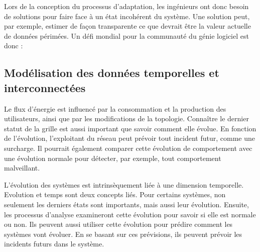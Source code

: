 Lors de la conception du processus d'adaptation, les ingénieurs ont donc besoin de solutions pour faire face à un état incohérent du système. Une solution peut, par exemple, estimer de façon transparente ce que devrait être la valeur actuelle de données périmées. Un défi mondial pour la communauté du génie logiciel est donc :
\vspace{-2em}

\subsection{Modélisation des données temporelles et interconnectées}
%
Le flux d'énergie est influencé par la consommation et la production des utilisateurs, ainsi que par les modifications de la topologie. 
Connaître le dernier statut de la grille est aussi important que savoir comment elle évolue.
En fonction de l'évolution, l'exploitant du réseau peut prévoir tout incident futur, comme une surcharge.
Il pourrait également comparer cette évolution de comportement avec une évolution normale pour détecter, par exemple, tout comportement malveillant.

%
L'évolution des systèmes est intrinsèquement liée à une dimension temporelle.
Evolution et temps sont deux concepts liés.
Pour certains systèmes, non seulement les derniers états sont importants, mais aussi leur évolution.
Ensuite, les processus d'analyse examineront cette évolution pour savoir si elle est normale ou non.
Ils peuvent aussi utiliser cette évolution pour prédire comment les systèmes vont évoluer.
En se basant sur ces prévisions, ils peuvent prévoir les incidents futurs dans le système.


